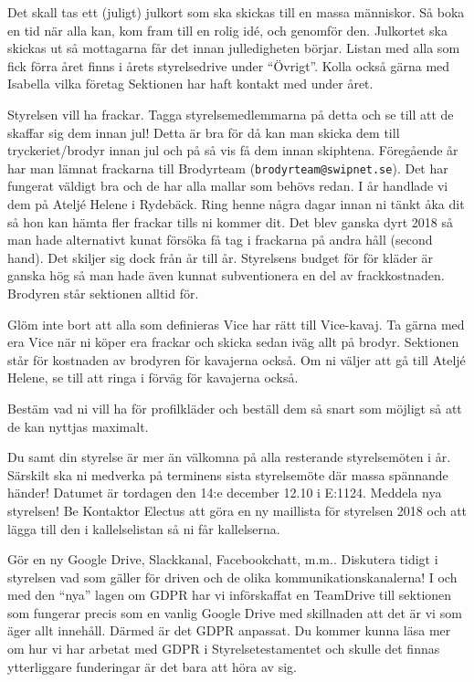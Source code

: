 \documentclass[10pt]{article}
\begin{document}
\begin{numplist}
    \item Det skall tas ett (juligt) julkort som ska skickas till en massa människor. Så boka en tid när alla kan, kom fram till en rolig idé, och genomför den. Julkortet ska skickas ut så mottagarna får det innan julledigheten börjar. Listan med alla som fick förra året finns i årets styrelsedrive under ``Övrigt''. Kolla också gärna med Isabella vilka företag Sektionen har haft kontakt med under året.
    
    \item Styrelsen vill ha frackar. Tagga styrelsemedlemmarna på detta och se till att de skaffar sig dem innan jul! Detta är bra för då kan man skicka dem till tryckeriet/brodyr innan jul och på så vis få dem innan skiphtena. Föregående år har man lämnat frackarna till Brodyrteam (\texttt{brodyrteam@swipnet.se}). Det har fungerat väldigt bra och de har alla mallar som behövs redan. I år handlade vi dem på Ateljé Helene i Rydebäck. Ring henne några dagar innan ni tänkt åka dit så hon kan hämta fler frackar tills ni kommer dit. Det blev ganska dyrt 2018 så man hade alternativt kunat försöka få tag i frackarna på andra håll (second hand). Det skiljer sig dock från år till år. Styrelsens budget för för kläder är ganska hög så man hade även kunnat subventionera en del av frackkostnaden. Brodyren står sektionen alltid för.
    
    \item Glöm inte bort att alla som definieras Vice har rätt till Vice-kavaj. Ta gärna med era Vice när ni köper era frackar och skicka sedan iväg allt på brodyr. Sektionen står för kostnaden av brodyren för kavajerna också. Om ni väljer att gå till Ateljé Helene, se till att ringa i förväg för kavajerna också.

    \item Bestäm vad ni vill ha för profilkläder och beställ dem så snart som möjligt så att de kan nyttjas maximalt.
    
    \item Du samt din styrelse är mer än välkomna på alla resterande styrelsemöten i år. Särskilt ska ni medverka på terminens sista styrelsemöte där massa spännande händer! Datumet är tordagen den 14:e december 12.10 i E:1124. Meddela nya styrelsen! Be Kontaktor Electus att göra en ny maillista för styrelsen 2018 och att lägga till den i kallelselistan så ni får kallelserna.
    
    \item Gör en ny Google Drive, Slackkanal, Facebookchatt, m.m.. Diskutera tidigt i styrelsen vad som gäller för driven och de olika kommunikationskanalerna! I och med den ``nya'' lagen om GDPR har vi införskaffat en TeamDrive till sektionen som fungerar precis som en vanlig Google Drive med skillnaden att det är vi som äger allt innehåll. Därmed är det GDPR anpassat. Du kommer kunna läsa mer om hur vi har arbetat med GDPR i Styrelsetestamentet och skulle det finnas ytterliggare funderingar är det bara att höra av sig.
    

\end{numplist}
\end{document}
